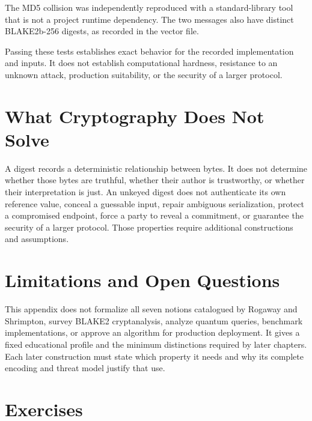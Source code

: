 The MD5 collision was independently reproduced with a standard-library tool
that is not a project runtime dependency. The two messages also have distinct
BLAKE2b-256 digests, as recorded in the vector file.

Passing these tests establishes exact behavior for the recorded implementation
and inputs. It does not establish computational hardness, resistance to an
unknown attack, production suitability, or the security of a larger protocol.

\section{What Cryptography Does Not Solve}

A digest records a deterministic relationship between bytes. It does not
determine whether those bytes are truthful, whether their author is
trustworthy, or whether their interpretation is just. An unkeyed digest does
not authenticate its own reference value, conceal a guessable input, repair
ambiguous serialization, protect a compromised endpoint, force a party to
reveal a commitment, or guarantee the security of a larger protocol. Those
properties require additional constructions and assumptions.

\section{Limitations and Open Questions}

This appendix does not formalize all seven notions catalogued by Rogaway and
Shrimpton, survey BLAKE2 cryptanalysis, analyze quantum queries, benchmark
implementations, or approve an algorithm for production deployment. It gives a
fixed educational profile and the minimum distinctions required by later
chapters. Each later construction must state which property it needs and why
its complete encoding and threat model justify that use.

\section{Exercises}

